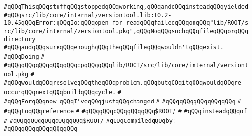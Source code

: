 \label{src/lib/core/internal/lib7-version.lib}
\verb|#qQQqThisqQQqstuffqQQqstoppedqQQqworking,qQQqandqQQqinsteadqQQqyielded|\newline
\verb|#qQQqsrc/lib/core/internal/versiontool.lib:10.2-10.45qQQqError:qQQqIo:qQQqopen_for_readqQQqfailedqQQqonqQQq"lib/ROOT/src/lib/core/internal/versiontool.pkg",qQQqNoqQQqsuchqQQqfileqQQqorqQQqdirectory|\newline
\verb|#qQQqandqQQqsureqQQqenoughqQQqtheqQQqfileqQQqwouldn'tqQQqexist.|\newline
\verb|#qQQqDoing|\newline
\verb|#|\newline
\verb|#qQQqqQQqqQQqqQQqqQQqcpqQQq|\verb|qQQqlib/ROOT/src/lib/core/internal/versiontool.pkg|\newline
\verb|#|\newline
\verb|#qQQqwouldqQQqresolveqQQqtheqQQqproblem,qQQqbutqQQqitqQQqwouldqQQqre-occurqQQqnextqQQqbuildqQQqcycle.|\newline
\verb|#|\newline
\verb|#qQQqForqQQqnow,qQQqI'veqQQqjustqQQqchanged|\newline
\verb|#|\newline
\verb|#qQQqqQQqqQQqqQQqqQQq|\newline
\verb|#|\newline
\verb|#qQQqtoqQQqreference|\newline
\verb|#|\newline
\verb|#qQQqqQQqqQQqqQQqqQQq$ROOT/|\newline
\verb|#|\newline
\verb|#qQQqinsteadqQQqof|\newline
\verb|#|\newline
\verb|#qQQqqQQqqQQqqQQqqQQq$ROOT/|\newline
\newline
\newline
\verb|#qQQqCompiledqQQqby:|\newline
\verb|#qQQqqQQqqQQqqQQqqQQq|\newline
\newline
